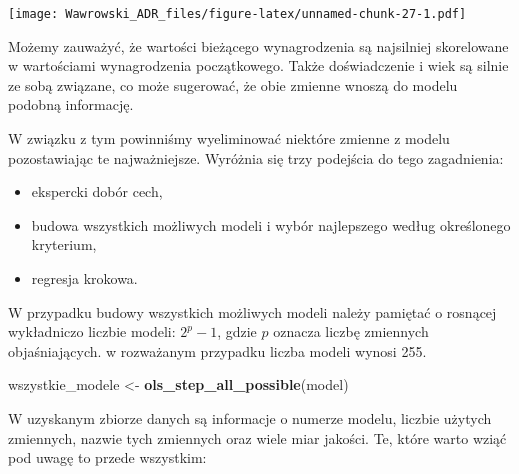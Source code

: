 \documentclass[]{book}
\newenvironment{Shaded}{\begin{snugshade}}{\end{snugshade}}
\newcommand{\DataTypeTok}[1]{\textcolor[rgb]{0.13,0.29,0.53}{#1}}
\newcommand{\KeywordTok}[1]{\textcolor[rgb]{0.13,0.29,0.53}{\textbf{#1}}}
\newcommand{\NormalTok}[1]{#1}
\newcommand{\OperatorTok}[1]{\textcolor[rgb]{0.81,0.36,0.00}{\textbf{#1}}}
\newcommand{\StringTok}[1]{\textcolor[rgb]{0.31,0.60,0.02}{#1}}
\providecommand{\tightlist}{%
  \setlength{\itemsep}{0pt}\setlength{\parskip}{0pt}}
\begin{document}
\begin{Shaded}
\end{Shaded}

\texttt{[image: Wawrowski\_ADR\_files/figure-latex/unnamed-chunk-27-1.pdf]}

Możemy zauważyć, że wartości bieżącego wynagrodzenia są najsilniej skorelowane w wartościami wynagrodzenia początkowego. Także doświadczenie i wiek są silnie ze sobą związane, co może sugerować, że obie zmienne wnoszą do modelu podobną informację.

W związku z tym powinniśmy wyeliminować niektóre zmienne z modelu pozostawiając te najważniejsze. Wyróżnia się trzy podejścia do tego zagadnienia:

\begin{itemize}
\tightlist
\item
  ekspercki dobór cech,
\item
  budowa wszystkich możliwych modeli i wybór najlepszego według określonego kryterium,
\item
  regresja krokowa.
\end{itemize}

W przypadku budowy wszystkich możliwych modeli należy pamiętać o rosnącej wykładniczo liczbie modeli: \(2^p-1\), gdzie \(p\) oznacza liczbę zmiennych objaśniających. w rozważanym przypadku liczba modeli wynosi 255.

\begin{Shaded}
\begin{Highlighting}[]
\NormalTok{wszystkie_modele <-}\StringTok{ }\KeywordTok{ols_step_all_possible}\NormalTok{(model)}
\end{Highlighting}
\end{Shaded}

W uzyskanym zbiorze danych są informacje o numerze modelu, liczbie użytych zmiennych, nazwie tych zmiennych oraz wiele miar jakości. Te, które warto wziąć pod uwagę to przede wszystkim:
\end{document}
